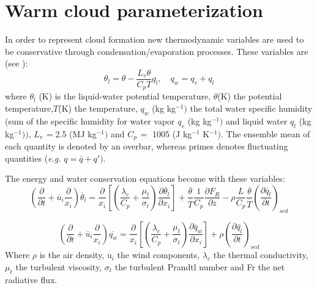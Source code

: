 \section{Warm cloud parameterization}
In order to represent cloud formation new thermodynamic variables are used
to be conservative through condensation/evaporation processes. These
variables are (see \cite{Betts:1973}):
\begin{equation}
\theta_{l} =\theta -\frac{L_{v} \theta }{C_{p} T }q_{l},
\quad
q_{w} =q_{v} +q_{l}
\end{equation}
\newline
where $\theta_{l}$ (K) is the liquid-water potential temperature,
\newline
$\theta $(K) the potential temperature,$T $(K) the temperature,
\newline
$q_{w}$ (kg kg$^{-1})$ the total water specific humidity (sum of the specific humidity
for water vapor $q_{v}$ (kg kg$^{-1})$ and liquid water $q_{l}$ (kg
kg$^{-1}))$,
\newline
$ L_{v\, }=$2.5 (MJ kg$^{-1})$ and $C_{p\, }=$ 1005 (J kg$^{-1}$ K$^{-1})$.
\newline
The ensemble mean of each quantity is denoted by an
overbar, whereas primes denotes fluctuating quantities (\emph{e.g.} $q=\bar{q}+q')$.

The energy and water conservation equations become with these variables:
\newline
\newline
\begin{equation}
\left( \frac{\partial }{\partial t}+\overline u_{i} \frac{\partial }{x_{i}}
\right)\overline \theta_{l} =\frac{\partial }{x_{i}}\left[ \left(
\frac{\lambda_{c}}{C_{p}}+\frac{\mu_{t}}{\sigma_{t}}
\right)\frac{\partial \overline \theta_{l} }{\partial x_{i}}
\right]+\frac{\overline \theta }{\overline T }\frac{1}{C_{p}}\frac{\partial
F_{R}}{\partial z}-\rho \frac{L}{C_{p}}\frac{\overline \theta }{\overline T}\left(
\frac{\partial \overline q_{l} }{\partial t} \right)_{sed}
\end{equation}

\begin{equation}
\left( \frac{\partial }{\partial t}+\overline u_{i} \frac{\partial }{x_{i}}
\right)\overline {q_{w}} =\frac{\partial }{x_{i}}\left[ \left( \frac{\lambda
_{c}}{C_{p}}+\frac{\mu_{t}}{\sigma_{t}} \right)\frac{\partial \overline
q_{w} }{\partial x_{i}} \right]+\rho \left( \frac{\partial
\bar{q_{l}}}{\partial t} \right)_{sed}
\end{equation}
Where $\rho $ is the air density, u$_{i}$ the wind components, $\lambda_{c}$ the thermal conductivity, $\mu_{t}$ the turbulent viscosity,
$\sigma_{t}$ the turbulent Prandtl number and Fr the net radiative flux.

